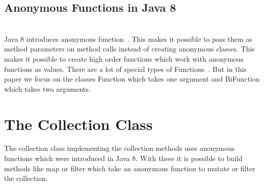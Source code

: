 \documentclass[runningheads,a4paper]{llncs}
\begin{document}
\subsection{Anonymous Functions in Java 8}
\lstset{caption=A Function which takes an Integer and squares it and a BiFunction which takes two Integers and returns if the first is greater than the second., language=Java, label=list:lambda}

\\
Java 8 introduces anonymous function~\cite{java8release}. This makes it possible to pass them as method parameters on method calls instead of creating anonymous classes.
This makes it possible to create high order functions which work with anonymous functions as values.
There are a lot of special types of Functions~\cite{java8function}.
But in this paper we focus on the classes Function which takes one argument and BiFunction which takes two arguments.\\


\section{The Collection Class}\label{sub:collection-class}
The collection class implementing the collection methods uses anonymous functions which were introduced in Java 8.
With these it is possible to build methods like map or filter which take an anonymous function to mutate or filter the collection.\\
\end{document}
